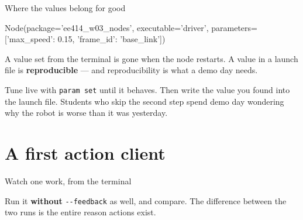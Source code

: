 \documentclass[aspectratio=169]{beamer}
\begin{document}
\begin{frame}[fragile]{Where the values belong for good}
  \begin{pycodes}
Node(package='ee414_w03_nodes', executable='driver',
     parameters=[{'max_speed': 0.15, 'frame_id': 'base_link'}])
  \end{pycodes}

  \vspace{0.5em}
  \small
  A value set from the terminal is gone when the node restarts. A value in a launch file is
  \textbf{reproducible} --- and reproducibility is what a demo day needs.

  \vspace{0.5em}
  \begin{underhood}
    \footnotesize
    Tune live with \texttt{param set} until it behaves. Then write the value you found into the
    launch file. Students who skip the second step spend demo day wondering why the robot is
    worse than it was yesterday.
  \end{underhood}
\end{frame}

\section{A first action client}

\begin{frame}[fragile]{Watch one work, from the terminal}

  \vspace{0.3em}
  \small
  Run it \textbf{without} \texttt{-{}-feedback} as well, and compare. The difference between
  the two runs is the entire reason actions exist.
\end{frame}
\end{document}
